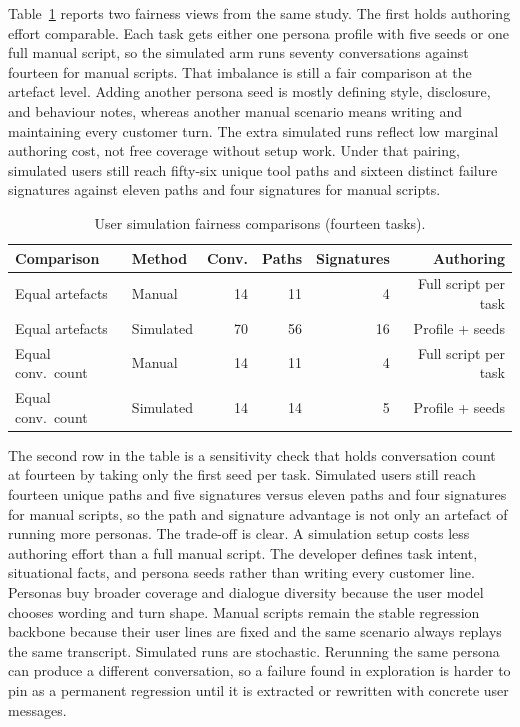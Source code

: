 Table~\ref{tab:user-sim-fairness} reports two fairness views from the same study. The first holds authoring effort comparable. Each task gets either one persona profile with five seeds or one full manual script, so the simulated arm runs seventy conversations against fourteen for manual scripts. That imbalance is still a fair comparison at the artefact level. Adding another persona seed is mostly defining style, disclosure, and behaviour notes, whereas another manual scenario means writing and maintaining every customer turn. The extra simulated runs reflect low marginal authoring cost, not free coverage without setup work. Under that pairing, simulated users still reach fifty-six unique tool paths and sixteen distinct failure signatures against eleven paths and four signatures for manual scripts.

\begin{table}[htbp]
\centering
\caption{User simulation fairness comparisons (fourteen tasks).}
\label{tab:user-sim-fairness}
\small
\begin{tabular}{@{}llrrrr@{}}
\toprule
Comparison & Method & Conv. & Paths & Signatures & Authoring \\
\midrule
Equal artefacts & Manual & 14 & 11 & 4 & Full script per task \\
Equal artefacts & Simulated & 70 & 56 & 16 & Profile + seeds \\
Equal conv.\ count & Manual & 14 & 11 & 4 & Full script per task \\
Equal conv.\ count & Simulated & 14 & 14 & 5 & Profile + seeds \\
\bottomrule
\end{tabular}
\end{table}

The second row in the table is a sensitivity check that holds conversation count at fourteen by taking only the first seed per task. Simulated users still reach fourteen unique paths and five signatures versus eleven paths and four signatures for manual scripts, so the path and signature advantage is not only an artefact of running more personas. The trade-off is clear. A simulation setup costs less authoring effort than a full manual script. The developer defines task intent, situational facts, and persona seeds rather than writing every customer line. Personas buy broader coverage and dialogue diversity because the user model chooses wording and turn shape. Manual scripts remain the stable regression backbone because their user lines are fixed and the same scenario always replays the same transcript. Simulated runs are stochastic. Rerunning the same persona can produce a different conversation, so a failure found in exploration is harder to pin as a permanent regression until it is extracted or rewritten with concrete user messages.

